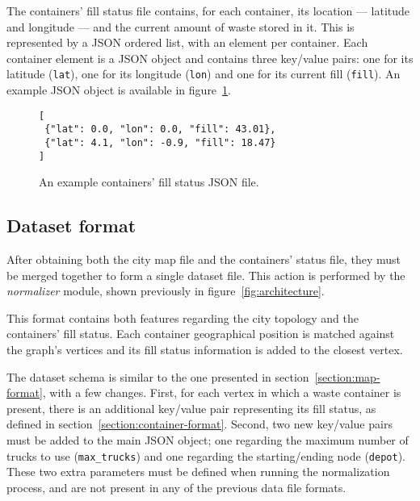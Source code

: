 The containers' fill status file contains, for each container, its location ---
latitude and longitude --- and the current amount of waste stored in it. This
is represented by a JSON ordered list, with an element per container. Each
container element is a JSON object and contains three key/value pairs: one for
its latitude (\texttt{lat}), one for its longitude (\texttt{lon}) and one for
its current fill (\texttt{fill}). An example JSON object is available in
figure~\ref{fig:containers-example}.

\begin{figure}[th]
  \begin{center}
    \leavevmode
      \begin{minipage}{9cm}
    \begin{verbatim}
[
 {"lat": 0.0, "lon": 0.0, "fill": 43.01},
 {"lat": 4.1, "lon": -0.9, "fill": 18.47}
]
    \end{verbatim}
    \end{minipage}
    \caption{An example containers' fill status JSON file.}
    \label{fig:containers-example}
  \end{center}
\end{figure}





\subsection{Dataset format}
\label{section:dataset-format}

After obtaining both the city map file and the containers' status file, they
must be merged together to form a single dataset file. This action is performed
by the \textit{normalizer} module, shown previously in figure~\ref{fig:architecture}.

This format contains both features regarding the city topology and the
containers' fill status. Each container geographical position is matched
against the graph's vertices and its fill status information is added to the
closest vertex.

The dataset schema is similar to the one presented in
section~\ref{section:map-format}, with a few changes. First, for each vertex in
which a waste container is present, there is an additional key/value pair
representing its fill status, as defined in
section~\ref{section:container-format}. Second, two new key/value pairs must be
added to the main JSON object; one regarding the maximum number of trucks to
use (\texttt{max\_trucks}) and one regarding the starting/ending node
(\texttt{depot}). These two extra parameters must be defined when running the normalization process,
and are not present in any of the previous data file formats.

